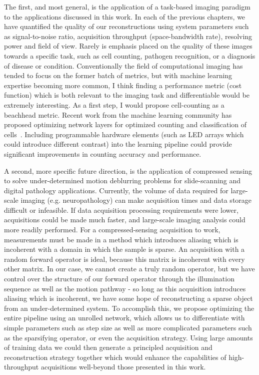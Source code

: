 The first, and most general, is the application of a task-based imaging paradigm to the applications discussed in this work. In each of the previous chapters, we have quantified the quality of our reconstructions using system parameters such as signal-to-noise ratio, acquisition throughput (space-bandwidth rate), resolving power and field of view. Rarely is emphasis placed on the quality of these images towards a specific task, such as cell counting, pathogen recognition, or a diagnosis of disease or condition. Conventionally the field of computational imaging has tended to focus on the former batch of metrics, but with machine learning expertise becoming more common, I think finding a performance metric (cost function) which is both relevant to the imaging task and differentiable would be extremely interesting. As a first step, I would propose cell-counting as a beachhead metric. Recent work from the machine learning community has proposed optimizing network layers for optimized counting and classification of cells~\cite{falk2019unet, xue2017cell}. Including programmable hardware elements (such as LED arrays which could introduce different contrast) into the learning pipeline could provide significant improvements in counting accuracy and performance.

A second, more specific future direction, is the application of compressed sensing to solve under-determined motion deblurring problems for slide-scanning and digital pathology applications. Currently, the volume of data required for large-scale imaging (e.g. neuropathology) can make acquisition times and data storage difficult or infeasible. If data acquisition processing requirements were lower, acquisitions could be made much faster, and large-scale imaging analysis could more readily performed. For a compressed-sensing acquisition to work, measurements must be made in a method which introduces aliasing which is incoherent with a domain in which the sample is sparse. An acquisition with a random forward operator is ideal, because this matrix is incoherent with every other matrix. In our case, we cannot create a truly random operator, but we have control over the structure of our forward operator through the illumination sequence as well as the motion pathway - so long as this acquisition introduces aliasing which is incoherent, we have some hope of reconstructing a sparse object from an under-determined system. To accomplish this, we propose optimizing the entire pipeline using an unrolled network, which allows us to differentiate with simple parameters such as step size as well as more complicated parameters such as the sparsifying operator, or even the acquisition strategy. Using large amounts of training data we could then generate a principled acquisition and reconstruction strategy together which would enhance the capabilities of high-throughput acquisitions well-beyond those presented in this work.


